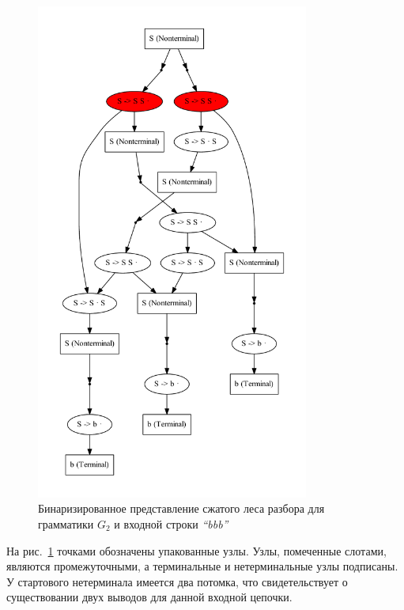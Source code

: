 \begin{figure}
 \centering
 \includegraphics[width=0.8\textwidth]{Ragozina/pics/GLLSppf.pdf}
 \caption{Бинаризированное представление сжатого леса разбора для грамматики $G_2$ и входной строки {\it ``bbb''} }
 \label{SPPF2}
\end{figure}

На рис.~\ref{SPPF2} точками обозначены упакованные узлы. Узлы, помеченные слотами, являются промежуточными, а терминальные и нетерминальные узлы подписаны. У стартового нетерминала имеется два потомка, что свидетельствует о существовании двух выводов для данной входной цепочки.

